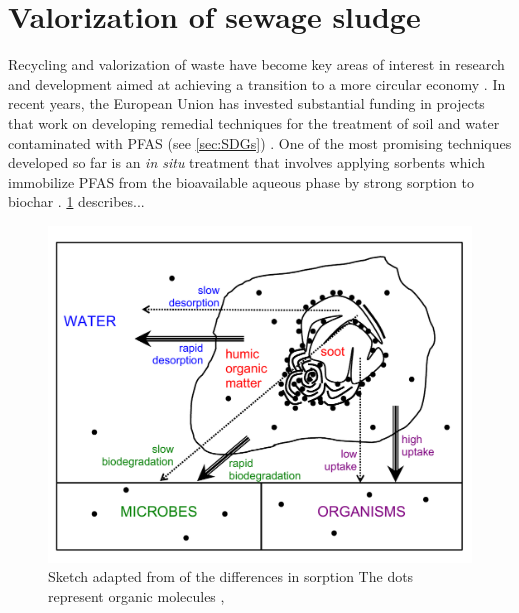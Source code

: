 
\section{Valorization of sewage sludge}
Recycling and valorization of waste have become key areas of interest in research and development aimed at achieving a transition to a more circular economy \citep{Ahmad2014}. In recent years, the European Union has invested substantial funding in projects that work on developing remedial techniques for the treatment of soil and water contaminated with PFAS (see \cref{sec:SDGs}) \citep{EC2020PFAS,ECHA2020}. One of the most promising techniques developed so far is an \textit{in situ} treatment that involves applying sorbents which immobilize PFAS from the bioavailable aqueous phase by strong sorption to biochar \citep{Ahmad2014,Sormo2021,Kupryianchyk2016b}. \cref{fig:cornelissen_sorption} describes...

\begin{figure}
    \centering
    \includegraphics[width=\textwidth]{Diagrams/Cornelissen_sorption.pdf}
    \caption{Sketch adapted from \citep{Cornelissen2005} of the differences in sorption The dots represent organic molecules , }
    \label{fig:cornelissen_sorption}
\end{figure}


